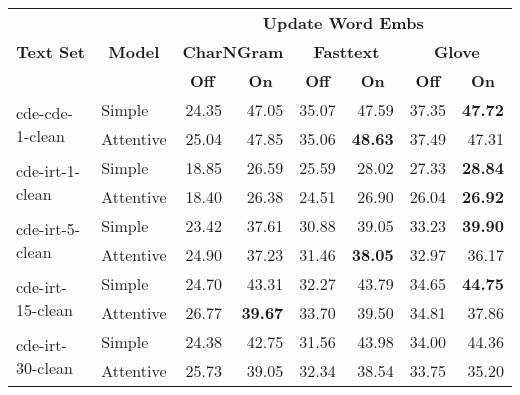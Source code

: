 \begin{tabular}{| l | l | r | r | r | r | r | r |}
    \hline

    \multicolumn{1}{|c|}{\multirow{3}{*}{\textbf{Text Set}}} &
    \multicolumn{1}{|c|}{\multirow{3}{*}{\textbf{Model}}} &
    \multicolumn{6}{|c|}{\textbf{Update Word Embs}} \\

    &
    &
    \multicolumn{2}{|c|}{\textbf{CharNGram}} &
    \multicolumn{2}{|c|}{\textbf{Fasttext}} &
    \multicolumn{2}{|c|}{\textbf{Glove}} \\

    &
    &
    \multicolumn{1}{|c|}{\textbf{Off}} &
    \multicolumn{1}{|c|}{\textbf{On}} &
    \multicolumn{1}{|c|}{\textbf{Off}} &
    \multicolumn{1}{|c|}{\textbf{On}} &
    \multicolumn{1}{|c|}{\textbf{Off}} &
    \multicolumn{1}{|c|}{\textbf{On}} \\

    \hline \hline

    \multirow{2}{*}{cde-cde-1-clean}
    & Simple    & 24.35 & 47.05 & 35.07 & 47.59 & 37.35 & \textbf{47.72} \\
    & Attentive & 25.04 & 47.85 & 35.06 & \textbf{48.63} & 37.49 & 47.31 \\ \hline

    \multirow{2}{*}{cde-irt-1-clean}
    & Simple    & 18.85 & 26.59 & 25.59 & 28.02 & 27.33 & \textbf{28.84} \\
    & Attentive & 18.40 & 26.38 & 24.51 & 26.90 & 26.04 & \textbf{26.92} \\ \hline

    \multirow{2}{*}{cde-irt-5-clean}
    & Simple    & 23.42 & 37.61 & 30.88 & 39.05 & 33.23 & \textbf{39.90} \\
    & Attentive & 24.90 & 37.23 & 31.46 & \textbf{38.05} & 32.97 & 36.17 \\ \hline

    \multirow{2}{*}{cde-irt-15-clean}
    & Simple    & 24.70 & 43.31 & 32.27 & 43.79 & 34.65 & \textbf{44.75} \\
    & Attentive & 26.77 & \textbf{39.67} & 33.70 & 39.50 & 34.81 & 37.86 \\ \hline

    \multirow{2}{*}{cde-irt-30-clean}
    & Simple    & 24.38 & 42.75 & 31.56 & 43.98 & 34.00 & 44.36 \\
    & Attentive & 25.73 & 39.05 & 32.34 & 38.54 & 33.75 & 35.20 \\ \hline \hline


\end{tabular}
